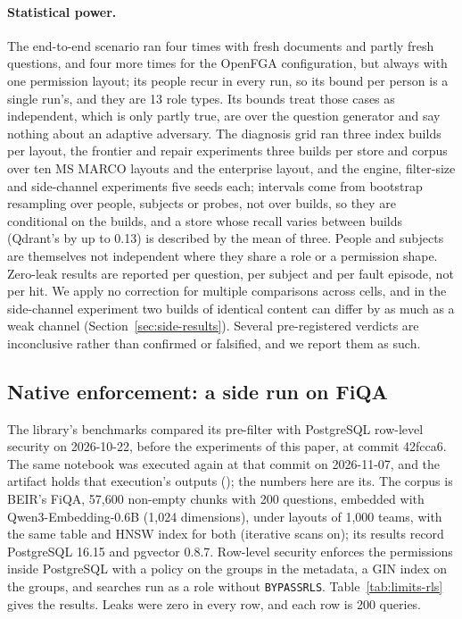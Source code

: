 \paragraph{Statistical power.}
The end-to-end scenario ran four times with fresh documents and partly fresh questions, and four more times for
the OpenFGA configuration, but always with one permission layout; its people recur in every run, so
its bound per person is a single run's, and they are 13 role types. Its bounds treat those cases as independent, which is only partly true, are over the question generator
and say nothing about an adaptive adversary. The diagnosis grid ran three index builds per layout, the
frontier and repair experiments three builds per store and corpus over ten MS MARCO layouts and the
enterprise layout, and the engine, filter-size and side-channel experiments five seeds each; intervals
come from bootstrap resampling over people, subjects or probes, not over builds, so they are conditional on the builds, and a store whose
recall varies between builds (Qdrant's by up to 0.13) is described by the mean of three. People and subjects are themselves not independent where they share a role or a permission shape. Zero-leak
results are reported per question, per subject and per fault episode, not per hit. We
apply no correction for multiple comparisons across cells, and in the side-channel experiment two
builds of identical content can differ by as much as a weak channel (Section~\ref{sec:side-results}).
Several pre-registered verdicts are inconclusive rather than confirmed or falsified, and we report
them as such.

\subsection{Native enforcement: a side run on FiQA}\label{sec:limits-native}

The library's benchmarks compared its pre-filter with PostgreSQL row-level security on 2026-10-22, before the experiments of this paper, at commit 42fcca6. The same notebook was executed again at that commit on 2026-11-07, and the artifact holds that execution's outputs (); the numbers here are its. The corpus is BEIR's FiQA, 57,600 non-empty chunks with 200 questions, embedded with Qwen3-Embedding-0.6B (1,024 dimensions), under layouts of 1,000 teams, with the same table and HNSW index for both (iterative scans on); its results record PostgreSQL 16.15 and pgvector 0.8.7. Row-level security enforces the permissions inside PostgreSQL with a policy on the groups in the metadata, a GIN index on the groups, and searches run as a role without \texttt{BYPASSRLS}. Table~\ref{tab:limits-rls} gives the results. Leaks were zero in every row, and each row is 200 queries.

